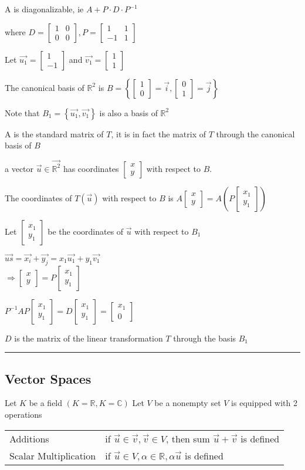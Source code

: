 \documentclass[12pt]{article}
\renewcommand{\v}[1]{\overrightarrow{#1}}
\newcommand\m[1]{\begin{bmatrix}#1\end{bmatrix}}
\newcommand{\real}[0]{\mathbb{R}}
\newcommand{\complex}[0]{\mathbb{C}}
\newcommand{\bb}[1]{\left\{#1\right\}}
\newcommand{\pp}[1]{\left(#1\right)}
\newcommand{\divider}[0]{\par\textcolor{lightgray}{\rule{\textwidth}{0.1pt}}}
\begin{document}
A is diagonalizable, ie \(A + P \cdot D \cdot P^{-1}\)

where \(D = \m{1 & 0 \\ 0 & 0}, P = \m{1 & 1 \\ -1 & 1}\)

Let \(\v{u_1} = \m{1 \\ -1}\) and \(\v{v_1} = \m{1 \\ 1}\)

The canonical basis of \(\real^2\) is \(B = \bb{\m{1 \\ 0} = \v{i}, \m{0 \\ 1} = \v{j}}\)

Note that \(B_1 = \bb{\v{u_1}, \v{v_1}}\) is also a basis of \(\real^2\)

A is the standard matrix of \(T\), it is in fact the matrix of \(T\) through the canonical basis of \(B\)

a vector \(\v{u} \in \v{\real^2}\) has coordinates \(\m{x \\ y}\) with respect to \(B\).

The coordinates of \(T(\v{u})\) with respect to \(B\) is \(A \m{x \\ y} = A\pp{P \m{x_1 \\ y_1}}\) 

Let \(\m{x_1 \\ y_1}\) be the coordinates of \(\v{u}\) with respect to \(B_1\)

\(\v{us} = \v{x_i} + \v{y_j} = x_1 \v{u_1} + y_1 \v{v_1}\) \\
\(\Rightarrow \m{x \\ y} = P \m{x_1 \\ y_1}\)

\(P^{-1}AP \m{x_1 \\ y_1} = D \m{x_1 \\ y_1} = \m{x_1 \\ 0}\)

\(D\) is the matrix of the linear transformation \(T\) through the basis \(B_1\)

\divider

\subsection{Vector Spaces}

Let \(K\) be a field \(\pp{K = \real, K = \complex}\)
Let \(V\) be a nonempty set
\(V\) is equipped with 2 operations

\begin{tabular}{@{} l l}
	Additions	& if \(\v{u} \in \v{v}, \v{v} \in V\), then sum \(\v{u} + \v{v}\) is defined \\
	Scalar Multiplication & if \(\v{u} \in V, \alpha \in \real, \alpha \v{u}\) is defined
\end{tabular}
\end{document}
